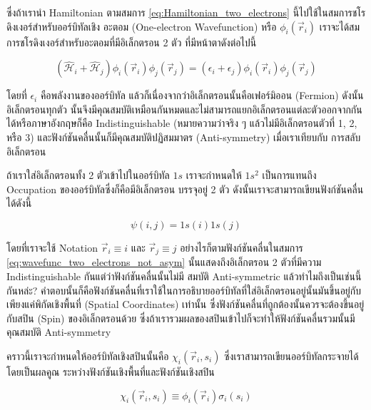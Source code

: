 \noindent ซึ่งถ้าเรานำ Hamiltonian ตามสมการ \ref{eq:Hamiltonian_two_electrons} นี้ไปใช้ในสมการชโรดิงเงอร์สำหรับออร์บิทัลเชิง%
อะตอม (One-electron Wavefunction) หรือ $\phi_{i}(\vec{r}_{i})$ เราจะได้สมการชโรดิงเงอร์สำหรับอะตอมที่มีอิเล็กตรอน 2 ตัว
ที่มีหน้าตาดังต่อไปนี้

\begin{equation}
    \left( \hat{\mathscr{H}}_{i} + \hat{\mathscr{H}}_{j} \right)
    \phi_{i}(\vec{r}_{i})
    \phi_{j}(\vec{r}_{j})
    =
    \left( \epsilon_{i} + \epsilon_{j} \right)
    \phi_{i}(\vec{r}_{i})
    \phi_{j}(\vec{r}_{j})
\end{equation}

\noindent โดยที่ $\epsilon_{i}$ คือพลังงานของออร์บิทัล แล้วก็เนื่องจากว่าอิเล็กตรอนนั้นคือเฟอร์มิออน (Fermion) ดังนั้นอิเล็กตรอนทุกตัว%
นั้นจึงมีคุณสมบัติเหมือนกันหมดและไม่สามารถแยกอิเล็กตรอนแต่ละตัวออกจากกันได้หรือภาษาอังกฤษก็คือ Indistinguishable
(หมายความว่าจริง ๆ แล้วไม่มีอิเล็กตรอนตัวที่ 1, 2, หรือ 3) และฟังก์ชันคลื่นนั้นก็มีคุณสมบัติปฏิสมมาตร (Anti-symmetry) เมื่อเราเทียบกับ%
การสลับอิเล็กตรอน

ถ้าเราใส่อิเล็กตรอนทั้ง 2 ตัวเข้าไปในออร์บิทัล $1s$ เราจะกำหนดให้ $1 s^2$ เป็นการแทนถึง Occupation ของออร์บิทัลซึ่งก็คือมีอิเล็กตรอน%
บรรจุอยู่ 2 ตัว ดังนั้นเราจะสามารถเขียนฟังก์ชันคลื่นได้ดังนี้

\begin{equation}
    \label{eq:wavefunc_two_electrons_not_asym}
    \psi(i, j) = 1 s(i) 1 s(j)
\end{equation}

\noindent โดยที่เราจะใช้ Notation $\vec{r}_i \equiv i$ และ $\vec{r}_j \equiv j$ อย่างไรก็ตามฟังก์ชันคลื่นในสมการ
\ref{eq:wavefunc_two_electrons_not_asym} นั้นแสดงถึงอิเล็กตรอน 2 ตัวที่มีความ Indistinguishable กันแต่ว่าฟังก์ชันคลื่นนั้นไม่มี%
สมบัติ Anti-symmetric แล้วทำไมถึงเป็นเช่นนี้กันหล่ะ? คำตอบนั้นก็คือฟังก์ชันคลื่นที่เราใช้ในการอธิบายออร์บิทัลที่ใส่อิเล็กตรอนอยู่นั้นมันขึ้นอยู่กับ%
เพียงแค่พิกัดเชิงพื้นที่ (Spatial Coordinates) เท่านั้น ซึ่งฟังก์ชันคลื่นที่ถูกต้องนั้นควรจะต้องขึ้นอยู่กับสปิน (Spin) ของอิเล็กตรอนด้วย%
ซึ่งถ้าเรารวมผลของสปินเข้าไปก็จะทำให้ฟังก์ชันคลื่นรวมนั้นมีคุณสมบัติ Anti-symmetry

คราวนี้เราจะกำหนดให้ออร์บิทัลเชิงสปินนั้นคือ $\chi_i\left(\vec{r}_i, s_i\right)$ ซึ่งเราสามารถเขียนออร์บิทัลกระจายได้โดยเป็นผลคูณ%
ระหว่างฟังก์ชันเชิงพื้นที่และฟังก์ชันเชิงสปิน

\begin{equation}
    \chi_i\left(\vec{r}_i, s_i\right)
    \equiv
    \phi_i\left(\vec{r}_i\right) \sigma_i\left(s_i\right)
\end{equation}

